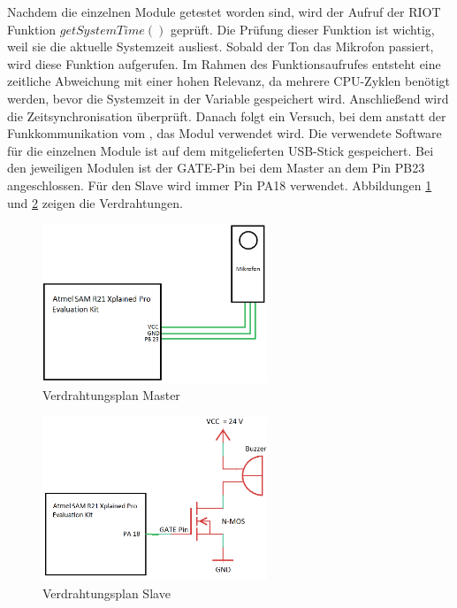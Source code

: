 
Nachdem die einzelnen Module getestet worden sind, wird der Aufruf der RIOT Funktion $getSystemTime()$ geprüft. Die Prüfung dieser Funktion ist wichtig, weil sie die aktuelle Systemzeit ausliest. Sobald der Ton das Mikrofon passiert, wird diese Funktion aufgerufen. Im Rahmen des Funktionsaufrufes entsteht eine zeitliche Abweichung mit einer hohen Relevanz, da mehrere CPU-Zyklen benötigt werden, bevor die Systemzeit in der Variable gespeichert wird. Anschließend wird die Zeitsynchronisation überprüft. Danach folgt ein Versuch, bei dem anstatt der Funkkommunikation vom \board, das \funkempfaenger \platz Modul verwendet wird. Die verwendete Software für die einzelnen Module ist auf dem mitgelieferten USB-Stick gespeichert. Bei den jeweiligen Modulen ist der \si{GATE}-Pin bei dem Master an dem Pin \si{PB23} angeschlossen. Für den Slave wird immer Pin \si{PA18} verwendet. Abbildungen \ref{img:verdrahtungsplan_master} und \ref{img:verdrahtungsplan_slave} zeigen die Verdrahtungen.

\begin{figure}[H]
	\centering
	\hspace*{-2cm}
	\includegraphics[width=0.6\textwidth]{images/schaltplan_master.png}
	\caption{Verdrahtungsplan Master}
	\label{img:verdrahtungsplan_master}
\end{figure}

\begin{figure}[H]
	\centering
	\hspace*{-2cm}
	\includegraphics[width=0.6\textwidth]{images/schaltplan_slave.png}
	\caption{Verdrahtungsplan Slave}
	\label{img:verdrahtungsplan_slave}
\end{figure}




